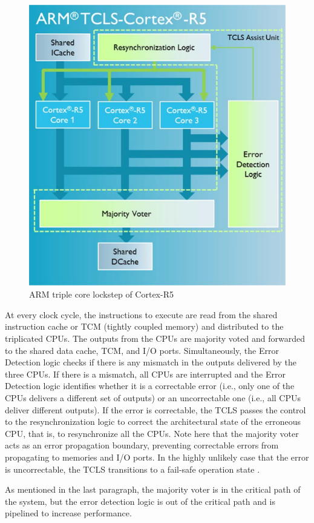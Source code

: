 \begin{figure}[H]

      \centering
      \includegraphics[width=0.7\linewidth]{images/tcls_architecture.png}
      \caption{ARM triple core lockstep of Cortex-R5 \citep{TCLS_cortex_r}}
      \label{fig:tcls_architecture}
    
\end{figure}

At every clock cycle, the instructions to execute are read
from the shared instruction cache or TCM (tightly coupled memory) and distributed to
the triplicated CPUs. The outputs from the CPUs are majority voted and
forwarded to the shared data cache, TCM, and I/O ports.
Simultaneously, the Error Detection logic checks if there is any
mismatch in the outputs delivered by the three CPUs. If there is
a mismatch, all CPUs are interrupted and the Error Detection
logic identifies whether it is a correctable error (i.e., only one
of the CPUs delivers a different set of outputs) or an
uncorrectable one (i.e., all CPUs deliver different outputs). If
the error is correctable, the TCLS passes the control to the
resynchronization logic to correct the architectural state of the
erroneous CPU, that is, to resynchronize all the CPUs. Note
here that the majority voter acts as an error propagation
boundary, preventing correctable errors from propagating to
memories and I/O ports. In the highly unlikely case that the
error is uncorrectable, the TCLS transitions to a fail-safe
operation state \citep{TCLS_cortex_r}.

As mentioned in the last paragraph, the majority voter is in the critical path of the system, but the error detection logic is out of the critical path and is pipelined to increase performance.

